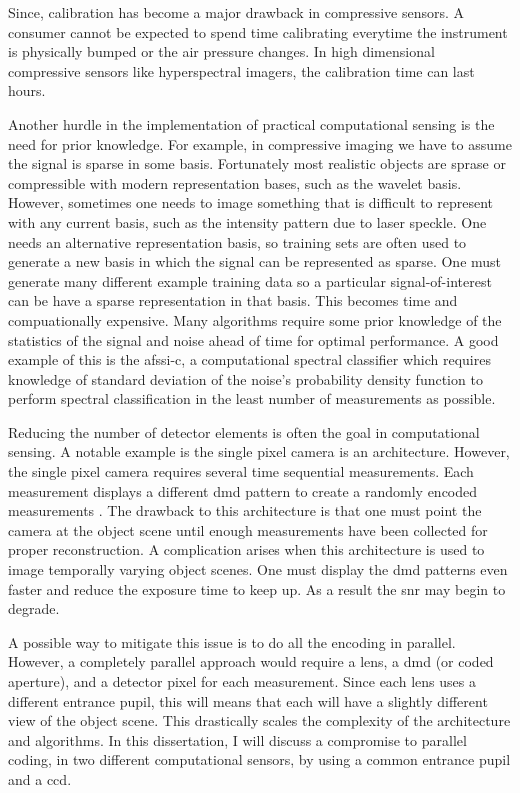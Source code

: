 Since, calibration has become a major drawback in \gls{compressive sensors}. A consumer cannot be expected to spend time calibrating everytime the instrument is physically bumped or the air pressure changes. In high dimensional compressive sensors like hyperspectral imagers, the calibration time can last hours.

Another hurdle in the implementation of practical computational sensing is the need for prior knowledge. For example, in compressive imaging we have to assume the signal is sparse in some basis. Fortunately most realistic objects are sprase or compressible with modern representation bases, such as the wavelet basis. However, sometimes one needs to image something that is difficult to represent with any current basis, such as the intensity pattern due to laser speckle. One needs an alternative representation basis, so training sets are often used to generate a new basis in which the signal can be represented as sparse. One must generate many different example training data so a particular signal-of-interest can be have a sparse representation in that basis. This becomes time and compuationally expensive. Many algorithms require some prior knowledge of the statistics of the signal and noise ahead of time for optimal performance. A good example of this is the \gls{afssi-c}, a computational spectral classifier which requires knowledge of standard deviation of the noise's probability density function to perform spectral classification in the least number of measurements as possible.

Reducing the number of detector elements is often the goal in computational sensing. A notable example is the single pixel camera is an architecture. However, the single pixel camera requires several time sequential measurements. Each measurement displays a different \gls{dmd} pattern to create a randomly encoded measurements \cite{duarte2008single}. The drawback to this architecture is that one must point the camera at the object scene until enough measurements have been collected for proper reconstruction. A complication arises when this architecture is used to image temporally varying object scenes. One must display the \gls{dmd} patterns even faster and reduce the exposure time to keep up. As a result the \gls{snr} may begin to degrade. 

A possible way to mitigate this issue is to do all the encoding in parallel. However, a completely parallel approach would require a lens, a \gls{dmd} (or coded aperture), and a detector pixel for each measurement. Since each lens uses a different entrance pupil, this will means that each will have a slightly different view of the object scene. This drastically scales the complexity of the architecture and algorithms. In this dissertation, I will discuss a compromise to parallel coding, in two different computational sensors, by using a common entrance pupil and a \gls{ccd}.

